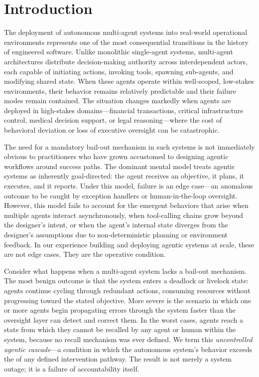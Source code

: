 \section{Introduction}

The deployment of autonomous multi-agent systems into real-world operational environments represents one of the most consequential transitions in the history of engineered software. Unlike monolithic single-agent systems, multi-agent architectures distribute decision-making authority across interdependent actors, each capable of initiating actions, invoking tools, spawning sub-agents, and modifying shared state. When these agents operate within well-scoped, low-stakes environments, their behavior remains relatively predictable and their failure modes remain contained. The situation changes markedly when agents are deployed in high-stakes domains—financial transactions, critical infrastructure control, medical decision support, or legal reasoning—where the cost of behavioral deviation or loss of executive oversight can be catastrophic.

The need for a mandatory bail-out mechanism in such systems is not immediately obvious to practitioners who have grown accustomed to designing agentic workflows around success paths. The dominant mental model treats agentic systems as inherently goal-directed: the agent receives an objective, it plans, it executes, and it reports. Under this model, failure is an edge case—an anomalous outcome to be caught by exception handlers or human-in-the-loop oversight. However, this model fails to account for the emergent behaviors that arise when multiple agents interact asynchronously, when tool-calling chains grow beyond the designer's intent, or when the agent's internal state diverges from the designer's assumptions due to non-deterministic planning or environment feedback. In our experience building and deploying agentic systems at scale, these are not edge cases. They are the operative condition.

Consider what happens when a multi-agent system lacks a bail-out mechanism. The most benign outcome is that the system enters a deadlock or livelock state: agents continue cycling through redundant actions, consuming resources without progressing toward the stated objective. More severe is the scenario in which one or more agents begin propagating errors through the system faster than the oversight layer can detect and correct them. In the worst cases, agents reach a state from which they cannot be recalled by any agent or human within the system, because no recall mechanism was ever defined. We term this \textit{uncontrolled agentic cascade}—a condition in which the autonomous system's behavior exceeds the \bounds of any defined intervention pathway. The result is not merely a system outage; it is a failure of accountability itself.

